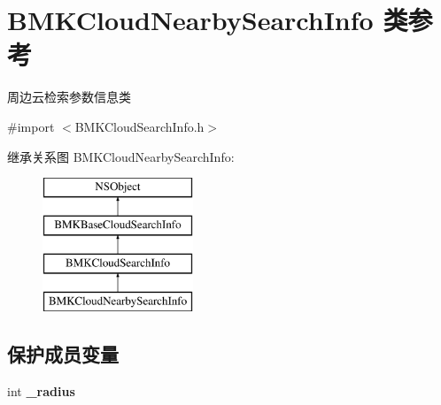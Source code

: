 \hypertarget{interface_b_m_k_cloud_nearby_search_info}{\section{B\-M\-K\-Cloud\-Nearby\-Search\-Info 类参考}
\label{interface_b_m_k_cloud_nearby_search_info}
}


周边云检索参数信息类  




{\ttfamily \#import $<$B\-M\-K\-Cloud\-Search\-Info.\-h$>$}

继承关系图 B\-M\-K\-Cloud\-Nearby\-Search\-Info\-:\begin{figure}[H]
\begin{center}
\leavevmode
\includegraphics[height=4.000000cm]{interface_b_m_k_cloud_nearby_search_info}
\end{center}
\end{figure}
\subsection*{保护成员变量}
\begin{DoxyCompactItemize}
\item 
\hypertarget{interface_b_m_k_cloud_nearby_search_info_a30c18210f666d7913e3f8d9c00161016}{int {\bfseries \-\_\-radius}}\label{interface_b_m_k_cloud_nearby_search_info_a30c18210f666d7913e3f8d9c00161016}

\end{DoxyCompactItemize}
